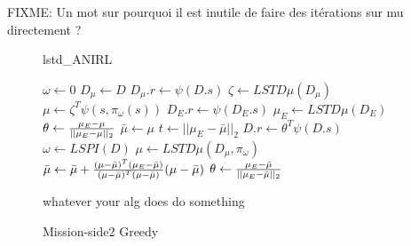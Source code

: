 \documentclass{article}
\begin{document}
FIXME: Un mot sur pourquoi il est inutile de faire des itérations sur mu directement ?
\begin{figure*}
 \begin{minipage}[t]{.45\textwidth}
 \begin{algorithm}[H]
   \caption{lstd\_ANIRL} 
   \label{alg:lstd_anirl} 
   \begin{algorithmic}[1]
     \STATE $\omega \leftarrow 0$
     \STATE $D_\mu \leftarrow D $
     \STATE $D_\mu.r \leftarrow \psi(D.s)$
     \STATE $\zeta \leftarrow LSTD\mu( D_\mu )$
     \STATE $\mu \leftarrow \zeta^T\psi(s,\pi_\omega(s))$
     \STATE $D_E.r \leftarrow \psi(D_E.s)$
     \STATE $\mu_E \leftarrow LSTD\mu( D_E )$
     \STATE $\theta \leftarrow {\mu_E - \mu\over ||\mu_E - \mu||_2}$
     \STATE $ \bar\mu \leftarrow \mu $
     \STATE $ t \leftarrow ||\mu_E - \bar\mu||_2 $
     \STATE $D.r \leftarrow \theta^T\psi(D.s)$
     \STATE $ \omega \leftarrow LSPI(D) $
     \STATE $ \mu \leftarrow LSTD\mu( D_\mu, \pi_\omega )$
     \STATE $\bar\mu \leftarrow \bar\mu + { (\mu-\bar\mu)^T (\mu_E-\bar\mu) \over (\mu-\bar\mu)^T (\mu-\bar\mu) } (\mu-\bar\mu) $
     \STATE $\theta \leftarrow 
       {\mu_E - \bar\mu\over ||\mu_E - \bar\mu||_2}$
     \ENDWHILE
   \end{algorithmic}
 \end{algorithm}
 \end{minipage}
 \hfill
 \begin{minipage}[t]{.45\textwidth}
   \begin{algorithm}[H]
     \caption{Mission-side2 Greedy} 
     \label{alg2} 
     \begin{algorithmic}[1]
       \STATE whatever your alg does
       \STATE do something
       \ENDFOR
     \end{algorithmic}
   \end{algorithm}
 \end{minipage}
 \hfill
\end{figure*}

\end{document}
